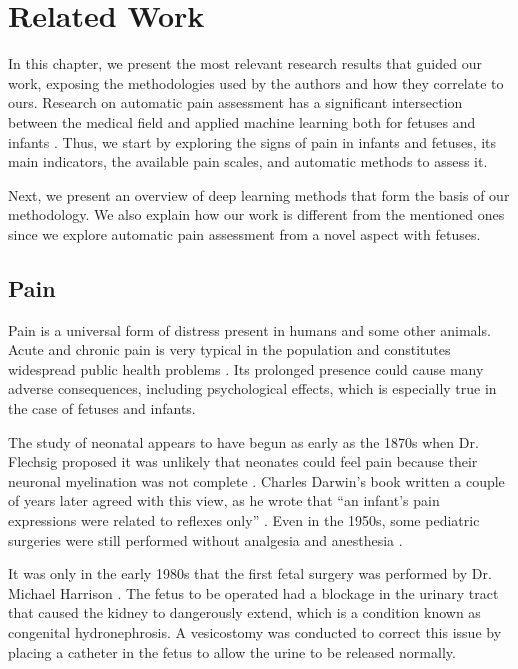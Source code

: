 \chapter{Related Work}

In this chapter, we present the most relevant research results that guided our work, exposing the methodologies used by the authors and how they correlate to ours. Research on automatic pain assessment has a significant intersection between the medical field and applied machine learning both for fetuses and infants \citep{ZamzmiPGKSA16, Bellieni2012}. Thus, we start by exploring the signs of pain in infants and fetuses, its main indicators, the available pain scales, and automatic methods to assess it. 

Next, we present an overview of deep learning methods that form the basis of our methodology. We also explain how our work is different from the mentioned ones since we explore automatic pain assessment from a novel aspect with fetuses.

\section{Pain}

Pain is a universal form of distress present in humans and some other animals. Acute and chronic pain is very typical in the population and constitutes widespread public health problems \citep{Goldberg2011}. Its prolonged presence could cause many adverse consequences, including psychological effects, which is especially true in the case of fetuses and infants.

The study of neonatal appears to have begun as early as the 1870s when Dr. Flechsig proposed it was unlikely that neonates could feel pain because their neuronal myelination was not complete \citep{cope1998neonatal}. Charles Darwin's book written a couple of years later agreed with this view, as he wrote that ``an infant's pain expressions were related to reflexes only'' \citep{darwin1872expression}. Even in the 1950s, some pediatric surgeries were still performed without analgesia and anesthesia \citep{cope1998neonatal}.

It was only in the early 1980s that the first fetal surgery was performed by Dr. Michael Harrison \citep{Harrison1982}. The fetus to be operated had a blockage in the urinary tract that caused the kidney to dangerously extend, which is a condition known as congenital hydronephrosis. A vesicostomy was conducted to correct this issue by placing a catheter in the fetus to allow the urine to be released normally.

